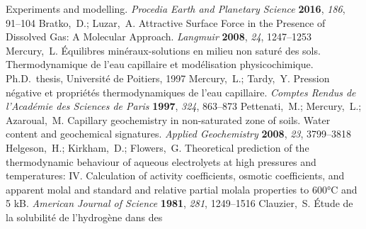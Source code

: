 \documentclass[aps,prl,twocolumn,superscriptaddress,groupedaddress]{revtex4}
\begin{document}
\begin{mcitethebibliography}{88}
  Experiments and modelling. \emph{Procedia Earth and Planetary Science}
  \textbf{2016}, \emph{186}, 91--104\relax
\mciteBstWouldAddEndPuncttrue
\mciteSetBstMidEndSepPunct{\mcitedefaultmidpunct}
{\mcitedefaultendpunct}{\mcitedefaultseppunct}\relax
\EndOfBibitem
{}
Bratko,~D.; Luzar,~A. Attractive Surface Force in the Presence of Dissolved
  Gas: A Molecular Approach. \emph{Langmuir} \textbf{2008}, \emph{24},
  1247--1253\relax
\mciteBstWouldAddEndPuncttrue
\mciteSetBstMidEndSepPunct{\mcitedefaultmidpunct}
{\mcitedefaultendpunct}{\mcitedefaultseppunct}\relax
\EndOfBibitem
{}
Mercury,~L. {\'E}quilibres min{\'e}raux-solutions en milieu non satur{\'e} des
  sols. Thermodynamique de l'eau capillaire et mod{\'e}lisation
  physicochimique. Ph.D.\ thesis, Universit{\'e} de Poitiers, 1997\relax
\mciteBstWouldAddEndPuncttrue
\mciteSetBstMidEndSepPunct{\mcitedefaultmidpunct}
{\mcitedefaultendpunct}{\mcitedefaultseppunct}\relax
\EndOfBibitem
{}
Mercury,~L.; Tardy,~Y. Pression n{\'e}gative et propri{\'e}t{\'e}s
  thermodynamiques de l'eau capillaire. \emph{Comptes Rendus de l'Acad{\'e}mie
  des Sciences de Paris} \textbf{1997}, \emph{324}, 863--873\relax
\mciteBstWouldAddEndPuncttrue
\mciteSetBstMidEndSepPunct{\mcitedefaultmidpunct}
{\mcitedefaultendpunct}{\mcitedefaultseppunct}\relax
\EndOfBibitem
{}
Pettenati,~M.; Mercury,~L.; Azaroual,~M. Capillary geochemistry in
  non-saturated zone of soils. Water content and geochemical signatures.
  \emph{Applied Geochemistry} \textbf{2008}, \emph{23}, 3799--3818\relax
\mciteBstWouldAddEndPuncttrue
\mciteSetBstMidEndSepPunct{\mcitedefaultmidpunct}
{\mcitedefaultendpunct}{\mcitedefaultseppunct}\relax
\EndOfBibitem
{}
Helgeson,~H.; Kirkham,~D.; Flowers,~G. Theoretical prediction of the
  thermodynamic behaviour of aqueous electrolyets at high pressures and
  temperatures: IV. Calculation of activity coefficients, osmotic coefficients,
  and apparent molal and standard and relative partial molala properties to
  600°C and 5 kB. \emph{American Journal of Science} \textbf{1981},
  \emph{281}, 1249--1516\relax
\mciteBstWouldAddEndPuncttrue
\mciteSetBstMidEndSepPunct{\mcitedefaultmidpunct}
{\mcitedefaultendpunct}{\mcitedefaultseppunct}\relax
\EndOfBibitem
{}
Clauzier,~S. {\'E}tude de la solubilit{\'e} de l'hydrog{\`e}ne dans des

\end{mcitethebibliography}
\end{document}
